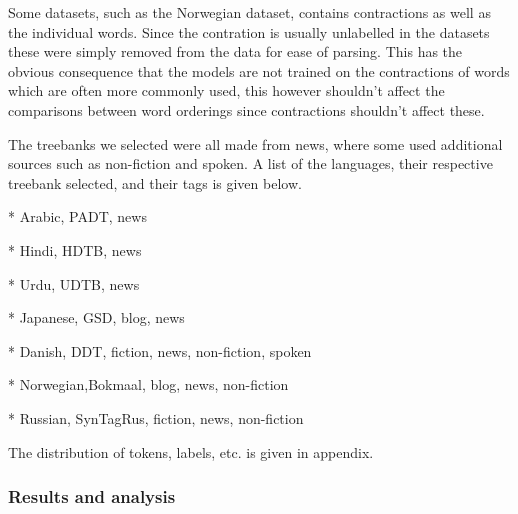 Some datasets, such as the Norwegian dataset, contains contractions as well as
the individual words. Since the contration is usually unlabelled in the datasets
these were simply removed from the data for ease of parsing. This has the
obvious consequence that the models are not trained on the contractions of words
which are often more commonly used, this however shouldn't affect the
comparisons between word orderings since contractions shouldn't affect these.

The treebanks we selected were all made from news, where some used additional
sources such as non-fiction and spoken. A list of the languages, their
respective treebank selected, and their tags is given below.

* Arabic,   PADT, news

* Hindi,    HDTB, news

* Urdu,     UDTB, news

* Japanese, GSD, blog, news

* Danish,   DDT, fiction, news, non-fiction, spoken

* Norwegian,Bokmaal, blog, news, non-fiction

* Russian,  SynTagRus, fiction, news, non-fiction

The distribution of tokens, labels, etc. is given in appendix.

\subsubsection{Results and analysis}


\pagebreak
